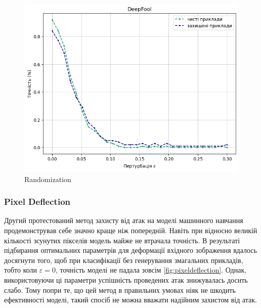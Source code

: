 \documentclass[a4paper,14pt]{extreport}
\begin{document}
\begin{figure}[!htb]
		\endminipage
		\includegraphics[width=1\textwidth]{resources/deepfool_rand_defence.png}
		\endminipage\hfill
		\caption{Randomization}
		\label{fig:randomization}
	\end{figure}

	\subsubsection{Pixel Deflection}
	\noindent
	Другий протестований метод захисту від атак на моделі машинного навчання продемонстрував себе значно краще ніж попередній. Навіть при відносно великій кількості зсунутих пікселів модель майже не втрачала точність. В результаті підбирання оптимальних параметрів для деформації вхідного зображення вдалось досягнути того, щоб при класифікації без генерування змагальних прикладів, тобто коли $\varepsilon=0$, точність моделі не падала зовсім \ref{fig:pixeldeflection}. Однак, використовуючи ці параметри успішність проведених атак знижувалась досить слабо. Тому попри те, що цей метод в правильних умовах ніяк не шкодить ефективності моделі, такий спосіб не можна вважати надійним захистом від атак.
	
\end{document}
